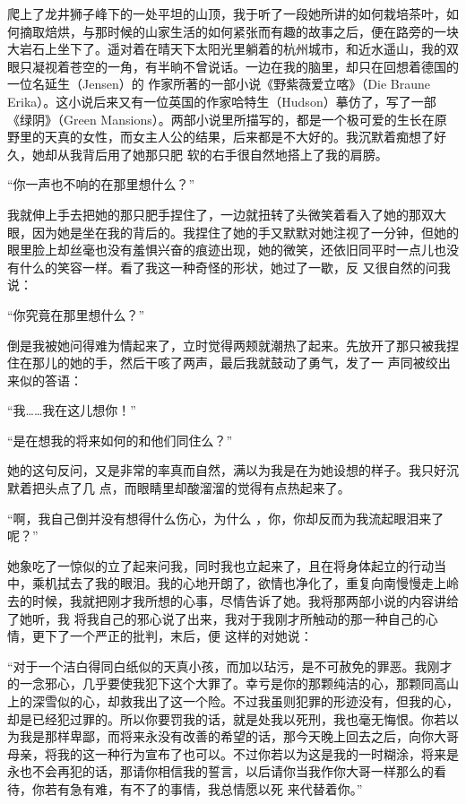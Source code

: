 \documentclass{article}
\begin{document}
爬上了龙井狮子峰下的一处平坦的山顶，我于听了一段她所讲的如何栽培茶叶，如何摘取焙烘，与那时候的山家生活的如何紧张而有趣的故事之后，便在路旁的一块大岩石上坐下了。遥对着在晴天下太阳光里躺着的杭州城市，和近水遥山，我的双眼只凝视着苍空的一角，有半晌不曾说话。一边在我的脑里，却只在回想着德国的一位名延生（Jensen）的
\newpage
作家所著的一部小说《野紫薇爱立喀》（Die Braune Erika）。这小说后来又有一位英国的作家哈特生（Hudson）摹仿了，写了一部《绿阴》（Green Mansions）。两部小说里所描写的，都是一个极可爱的生长在原野里的天真的女性，而女主人公的结果，后来都是不大好的。我沉默着痴想了好久，她却从我背后用了她那只肥
软的右手很自然地搭上了我的肩膀。 


“你一声也不响的在那里想什么？” 

我就伸上手去把她的那只肥手捏住了，一边就扭转了头微笑着看入了她的那双大眼，因为她是坐在我的背后的。我捏住了她的手又默默对她注视了一分钟，但她的眼里脸上却丝毫也没有羞惧兴奋的痕迹出现，她的微笑，还依旧同平时一点儿也没有什么的笑容一样。看了我这一种奇怪的形状，她过了一歇，反
又很自然的问我说： 


“你究竟在那里想什么？” 

\newpage

倒是我被她问得难为情起来了，立时觉得两颊就潮热了起来。先放开了那只被我捏住在那儿的她的手，然后干咳了两声，最后我就鼓动了勇气，发了一
声同被绞出来似的答语： 


“我……我在这儿想你！” 


“是在想我的将来如何的和他们同住么？” 

她的这句反问，又是非常的率真而自然，满以为我是在为她设想的样子。我只好沉默着把头点了几
点，而眼睛里却酸溜溜的觉得有点热起来了。 

“啊，我自己倒并没有想得什么伤心，为什么
，你，你却反而为我流起眼泪来了呢？” 

她象吃了一惊似的立了起来问我，同时我也立起来了，且在将身体起立的行动当中，乘机拭去了我的眼泪。我的心地开朗了，欲情也净化了，重复向南慢慢走上岭去的时候，我就把刚才我所想的心事，尽情告诉了她。我将那两部小说的内容讲给了她听，我
\newpage
将我自己的邪心说了出来，我对于我刚才所触动的那一种自己的心情，更下了一个严正的批判，末后，便
这样的对她说： 

“对于一个洁白得同白纸似的天真小孩，而加以玷污，是不可赦免的罪恶。我刚才的一念邪心，几乎要使我犯下这个大罪了。幸亏是你的那颗纯洁的心，那颗同高山上的深雪似的心，却救我出了这一个险。不过我虽则犯罪的形迹没有，但我的心，却是已经犯过罪的。所以你要罚我的话，就是处我以死刑，我也毫无悔恨。你若以为我是那样卑鄙，而将来永没有改善的希望的话，那今天晚上回去之后，向你大哥母亲，将我的这一种行为宣布了也可以。不过你若以为这是我的一时糊涂，将来是永也不会再犯的话，那请你相信我的誓言，以后请你当我作你大哥一样那么的看待，你若有急有难，有不了的事情，我总情愿以死
来代替着你。” 
\end{document}
